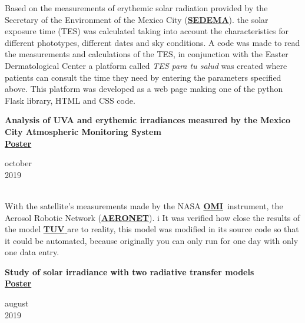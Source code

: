 \documentclass[a3paper]{adcv_color}
\newcommand*{\tuv}{\href{https://www2.acom.ucar.edu/modeling/tropospheric-ultraviolet-and-visible-tuv-radiation-model}{\textbf{TUV }}}
\newcommand*{\aeronet}{\href{https://aeronet.gsfc.nasa.gov/}{\textbf{AERONET}}}
\newcommand*{\sedema}{\href{https://www.sedema.cdmx.gob.mx/}{\textbf{SEDEMA}}}
\newcommand*{\omi}{\href{https://aura.gsfc.nasa.gov/omi.html}{\textbf{OMI}}}
\begin{document}
\begin{multicols}{2}
    Based on the measurements of erythemic solar radiation provided by the Secretary of the Environment of the 
    Mexico City (\sedema). the solar exposure time (TES) was calculated taking into account the characteristics for different phototypes, different dates and sky conditions.
     A code was made to read the measurements and calculations of the TES, in conjunction with the Easter Dermatological Center 
    a platform called \textit{TES para tu salud} was created where patients can consult the time they need by entering the parameters specified above. This platform was developed as a
    web page making one of the python Flask library, HTML and CSS code.\\

  \begin{minipage}{0.8\linewidth}
    \textbf{Analysis of UVA and erythemic irradiances measured by the Mexico City Atmospheric Monitoring System}\\
    \href{https://github.com/giovannilopez9808/Posters_templates/blob/master/2019/AFA/Analisis\%20indice\%20UV/Analisis\%20de\%20irradiancia.pdf}{\textbf{Poster}}
  \end{minipage}
    \begin{minipage}{0.2\linewidth}
      \vspace{-0.9cm}
      \begin{flushright}
      october \\2019
      \end{flushright}
    \end{minipage}\\

    With the satellite's measurements made by the NASA \omi~instrument, the Aerosol Robotic Network (\aeronet). i It was verified how close the results of the model \tuv are to reality, this model was modified in its source code so that it could be automated, because originally you can only run for one day with only one data entry.\\

  \begin{minipage}{0.8\linewidth}
    \textbf{Study of solar irradiance with two radiative transfer models}\\
    \href{https://github.com/giovannilopez9808/Posters_templates/tree/master/2019/CNF/Transferencia\%20radiativa}{\textbf{Poster}}
  \end{minipage}
    \begin{minipage}{0.2\linewidth}
      \vspace{-0.9cm}
      \begin{flushright}
      august \\2019
      \end{flushright}
    \end{minipage}\\


\end{multicols}
\end{document}
